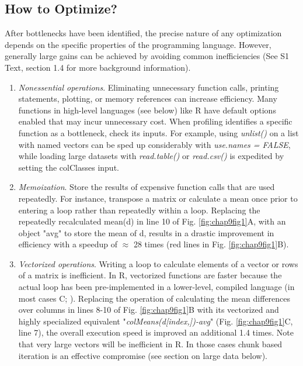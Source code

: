 \documentclass[b5paper,justified]{tufte-book} %
\begin{document}
\begin{fullwidth}
\section{How to Optimize?}
After bottlenecks have been identified, the precise nature of any optimization depends on the specific properties of the programming language. However, generally large gains can be achieved by avoiding common inefficiencies (See S1 Text, section 1.4 for more background information).

\begin{enumerate}

\item \textit{Nonessential operations}.
Eliminating unnecessary function calls, printing statements, plotting, or memory references can increase efficiency. Many functions in high-level languages (see below) like R have default options enabled that may incur unnecessary cost. When profiling identifies a specific function as a bottleneck, check its inputs. For example, using \emph{unlist()} on a list with named vectors can be sped up considerably with \emph{use.names = FALSE}, while loading large datasets with \emph{read.table()} or \emph{read.csv()} is expedited by setting the colClasses input. 

\item \textit{Memoization}.
Store the results of expensive function calls that are used repeatedly. For instance, transpose a matrix or calculate a mean once prior to entering a loop rather than repeatedly within a loop. Replacing the repeatedly recalculated mean(d) in line 10 of Fig. \ref{fig:chap9fig1}A, with an object "avg" to store the mean of d, results in a drastic improvement in efficiency with a speedup of $\approx$ 28 times (red lines in Fig. \ref{fig:chap9fig1}B).

\item \textit{Vectorized operations}.
Writing a loop to calculate elements of a vector or rows of a matrix is inefficient. In R, vectorized functions are faster because the actual loop has been pre-implemented in a lower-level, compiled language (in most cases C; \citealt{Schmidberger2009}). Replacing the operation of calculating the mean differences over columns in lines 8-10 of Fig. \ref{fig:chap9fig1}B with its vectorized and highly specialized equivalent "\emph{colMeans(d[index,])-avg}" (Fig. \ref{fig:chap9fig1}C, line 7), the overall execution speed is improved an additional 1.4 times. Note that very large vectors will be inefficient in R. In those cases chunk based iteration is an effective compromise (see section on large data below).


\end{enumerate}
\end{fullwidth}
\end{document}

